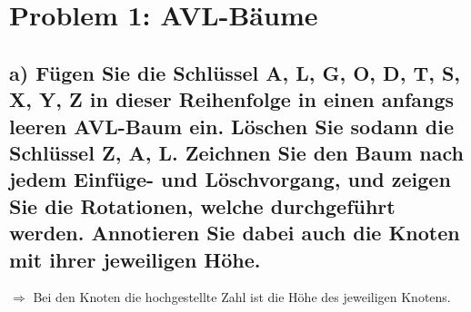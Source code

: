 
\section*{{Problem 1: AVL-Bäume}}


\subsection*{a) Fügen Sie die Schlüssel A, L, G, O, D, T, S, X, Y, Z in dieser Reihenfolge in einen anfangs leeren AVL-Baum ein. Löschen Sie sodann die Schlüssel Z, A, L. Zeichnen Sie den Baum nach jedem Einfüge- und Löschvorgang, und zeigen Sie die Rotationen, welche durchgeführt werden. Annotieren Sie dabei auch die Knoten mit ihrer jeweiligen Höhe.} 

$\Rightarrow$ Bei den Knoten die hochgestellte Zahl ist die Höhe des jeweiligen Knotens.

